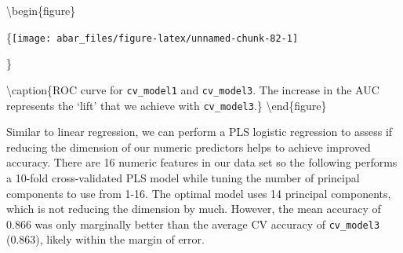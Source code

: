 \documentclass[]{book}
\newenvironment{Shaded}{\begin{snugshade}}{\end{snugshade}}
\newcommand{\CommentTok}[1]{\textcolor[rgb]{0.56,0.35,0.01}{\textit{#1}}}
\newcommand{\DataTypeTok}[1]{\textcolor[rgb]{0.13,0.29,0.53}{#1}}
\newcommand{\DecValTok}[1]{\textcolor[rgb]{0.00,0.00,0.81}{#1}}
\newcommand{\KeywordTok}[1]{\textcolor[rgb]{0.13,0.29,0.53}{\textbf{#1}}}
\newcommand{\NormalTok}[1]{#1}
\newcommand{\OperatorTok}[1]{\textcolor[rgb]{0.81,0.36,0.00}{\textbf{#1}}}
\newcommand{\StringTok}[1]{\textcolor[rgb]{0.31,0.60,0.02}{#1}}
\theoremstyle{definition}
\theoremstyle{definition}
\theoremstyle{definition}
\theoremstyle{remark}
\begin{document}
\textbackslash{}begin\{figure\}

\{\centering \texttt{[image: abar\_files/figure-latex/unnamed-chunk-82-1]}

\}

\textbackslash{}caption\{ROC curve for \texttt{cv\_model1} and
\texttt{cv\_model3}. The increase in the AUC represents the `lift' that
we achieve with \texttt{cv\_model3}.\}\label{fig:unnamed-chunk-82}
\textbackslash{}end\{figure\}

Similar to linear regression, we can perform a PLS logistic regression
to assess if reducing the dimension of our numeric predictors helps to
achieve improved accuracy. There are 16 numeric features in our data set
so the following performs a 10-fold cross-validated PLS model while
tuning the number of principal components to use from 1-16. The optimal
model uses 14 principal components, which is not reducing the dimension
by much. However, the mean accuracy of 0.866 was only marginally better
than the average CV accuracy of \texttt{cv\_model3} (0.863), likely
within the margin of error.

\begin{Shaded}
\end{Shaded}
\end{document}
